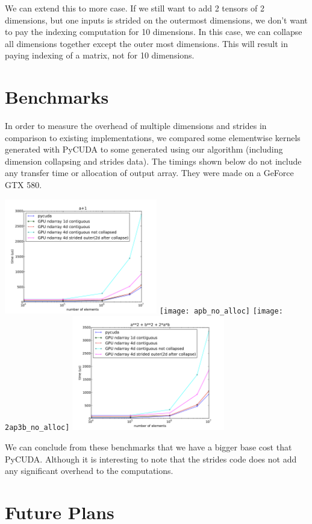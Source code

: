 \documentclass{article} %
\begin{document}
We can extend this to more case. If we still want to add 2 tensors of
2 dimensions, but one inputs is strided on the outermost dimensions,
we don't want to pay the indexing computation for 10 dimensions. In
this case, we can collapse all dimensions together except the outer
most dimensions. This will result in paying indexing of a matrix, not
for 10 dimensions.

\section{Benchmarks}

In order to measure the overhead of multiple dimensions and strides in comparison to existing implementations, we compared some elementwise kernels generated with PyCUDA to some generated using our algorithm (including dimension collapsing and strides data).
The timings shown below do not include any transfer time or allocation of output array.
They were made on a GeForce GTX 580.

\includegraphics[width=0.5\textwidth]{ap1_no_alloc}
\texttt{[image: apb\_no\_alloc]}
\texttt{[image: 2ap3b\_no\_alloc]}
\includegraphics[width=0.5\textwidth]{a2pb2p2ab_no_alloc}

We can conclude from these benchmarks that we have a bigger base cost that PyCUDA.
Although it is interesting to note that the strides code does not add any significant overhead to the computations.

\section{Future Plans}
\end{document}
